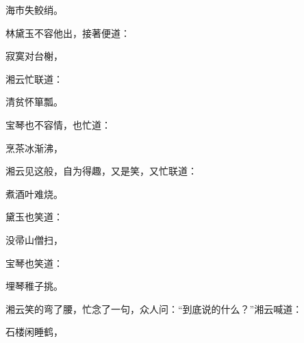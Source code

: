 \begin{poem}
    \begin{pl} 海市失鲛绡。\end{pl}
\end{poem}
\begin{parag}
    林黛玉不容他出，接著便道：
\end{parag}
\begin{poem}
    \begin{pl} 寂寞对台榭，\end{pl}
\end{poem}
\begin{parag}
    湘云忙联道：
\end{parag}
\begin{poem}
    \begin{pl} 清贫怀箪瓢。\end{pl}
\end{poem}
\begin{parag}
    宝琴也不容情，也忙道：
\end{parag}
\begin{poem}
    \begin{pl} 烹茶冰渐沸，\end{pl}
\end{poem}
\begin{parag}
    湘云见这般，自为得趣，又是笑，又忙联道：
\end{parag}
\begin{poem}
    \begin{pl} 煮酒叶难烧。\end{pl}
\end{poem}
\begin{parag}
    黛玉也笑道：
\end{parag}
\begin{poem}
    \begin{pl} 没帚山僧扫，\end{pl}
\end{poem}
\begin{parag}
    宝琴也笑道：
\end{parag}
\begin{poem}
    \begin{pl} 埋琴稚子挑。\end{pl}
\end{poem}
\begin{parag}
    湘云笑的弯了腰，忙念了一句，众人问：“到底说的什么？”湘云喊道：
\end{parag}
\begin{poem}
    \begin{pl} 石楼闲睡鹤，\end{pl}
\end{poem}
